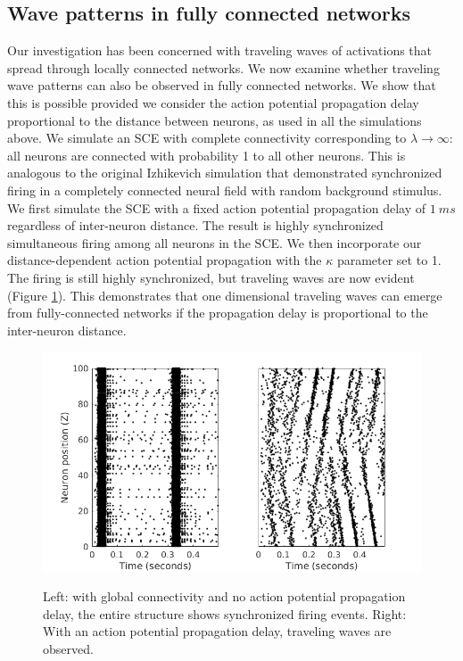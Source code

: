 \documentclass[12pt]{article}
\begin{document}
\subsection{Wave patterns in fully connected networks} \label{sub:delay}
Our investigation has been concerned with traveling waves of activations that spread through locally connected networks.
We now examine whether traveling wave patterns can also be observed in fully connected networks.
We show that this is possible provided we consider the action potential propagation delay proportional to the distance between neurons, as used in all the simulations above.
We simulate an SCE with complete connectivity corresponding to $\lambda \rightarrow \infty$: all neurons are connected with probability 1 to all other neurons.
This is analogous to the original Izhikevich simulation that demonstrated synchronized firing in a completely connected neural field with random background stimulus.
We first simulate the SCE with a fixed action potential propagation delay of $1~ms$ regardless of inter-neuron distance.
The result is highly synchronized simultaneous firing among all neurons in the SCE.
We then incorporate our distance-dependent action potential propagation with the $\kappa$ parameter set to 1.
The firing is still highly synchronized, but traveling waves are now evident (Figure \ref{fig:delay_waves}).
This demonstrates that one dimensional traveling waves can emerge from fully-connected networks if the propagation delay is proportional to the inter-neuron distance.
\begin{figure}[!htb]
 \caption{Left: with global connectivity and no action potential propagation delay, the entire structure shows synchronized firing events. Right: With an action potential propagation delay, traveling waves are observed.}
 \centering
   \includegraphics[width=\textwidth]{fig/DelayWaves}  
 \label{fig:delay_waves}
\end{figure}
\end{document}
